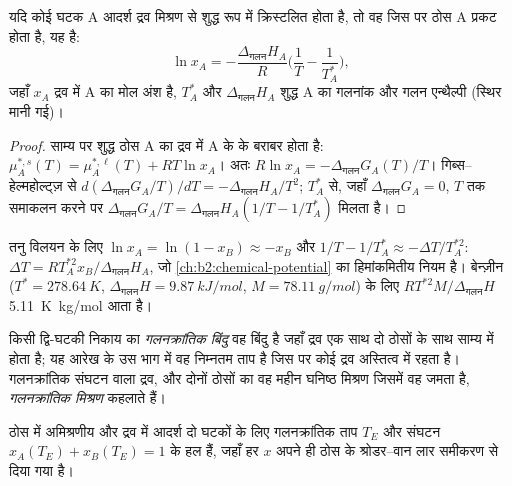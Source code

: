 \begin{theorem}[श्रोडर--वान लार]\label{thm:b2:solid-liquid-diagrams:schroder}
यदि कोई घटक A आदर्श द्रव मिश्रण से शुद्ध रूप में क्रिस्टलित होता है, तो वह 
जिस पर ठोस A प्रकट होता है, यह है:
\[
  \ln x_A = -\frac{\Delta_{\text{गलन}}H_A}{R}\Big(\frac1T - \frac1{T_A^*}\Big),
\]
जहाँ $x_A$ द्रव में A का मोल अंश है, $T_A^*$ और
$\Delta_{\text{गलन}}H_A$ शुद्ध A का गलनांक और गलन एन्थैल्पी
(स्थिर मानी गई)।
\end{theorem}

\begin{proof}
साम्य पर शुद्ध ठोस A का  द्रव में A के  के बराबर होता है:
$\mu_A^{*,s}(T) = \mu_A^{*,\ell}(T) + RT\ln x_A$। अतः $R\ln x_A =
-\Delta_{\text{गलन}}G_A(T)/T$। गिब्स--हेल्महोल्ट्ज़ से $d(\Delta_{\text{गलन}}G_A/T)/
dT = -\Delta_{\text{गलन}}H_A/T^2$; $T_A^*$ से, जहाँ
$\Delta_{\text{गलन}}G_A = 0$, $T$ तक समाकलन करने पर $\Delta_{\text{गलन}}G_A/T =
\Delta_{\text{गलन}}H_A(1/T - 1/T_A^*)$ मिलता है।
\end{proof}

तनु विलयन के लिए $\ln x_A = \ln(1 - x_B) \approx -x_B$ और $1/T -
1/T_A^* \approx -\Delta T/T_A^{*2}$: $\Delta T = RT_A^{*2}x_B/\Delta_{\text{गलन}}H_A$,
जो \cref{ch:b2:chemical-potential} का हिमांकमितीय नियम है। बेन्ज़ीन ($T^* =
\qty{278.64}{K}$, $\Delta_{\text{गलन}}H = \qty{9.87}{kJ/mol}$, $M =
\qty{78.11}{g/mol}$) के लिए  $RT^{*2}M/\Delta_{\text{गलन}}H$
\qty{5.11}{K.kg/mol} आता है।

\begin{definition}[गलनक्रांतिक]\label{def:b2:solid-liquid-diagrams:eutectic}
किसी द्वि-घटकी निकाय का \emph{गलनक्रांतिक बिंदु} वह
बिंदु है जहाँ द्रव एक साथ दो ठोसों के साथ साम्य में होता है; यह आरेख के उस भाग में वह
निम्नतम ताप है जिस पर कोई द्रव अस्तित्व में रहता है।
गलनक्रांतिक संघटन वाला द्रव, और दोनों ठोसों का वह महीन घनिष्ठ मिश्रण
जिसमें वह जमता है, \emph{गलनक्रांतिक
मिश्रण} कहलाते हैं।
\end{definition}

\begin{corollary}[गलनक्रांतिक वहाँ है जहाँ लिक्विडस की शाखाएँ मिलती हैं]\label{cor:b2:solid-liquid-diagrams:eutectic}
ठोस में अमिश्रणीय और द्रव में आदर्श दो घटकों के लिए
गलनक्रांतिक ताप $T_E$ और संघटन
$x_A(T_E) + x_B(T_E) = 1$ के हल हैं, जहाँ हर $x$ अपने ही ठोस के
श्रोडर--वान लार समीकरण से दिया गया है।
\end{corollary}

